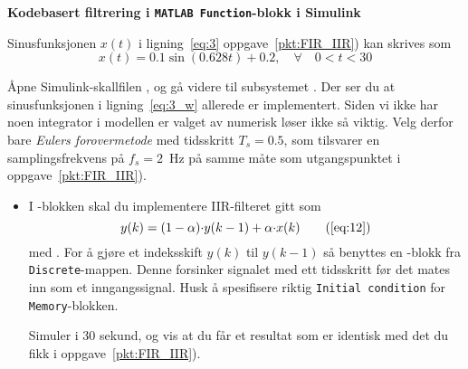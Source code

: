 \item
  {\bf Kodebasert filtrering i {\tt MATLAB Function}-blokk i Simulink}

  Sinusfunksjonen $x(t)$ i ligning~\eqref{eq:3}
  oppgave~\ref{pkt:FIR_IIR}) kan skrives som 
\begin{equation}
  x(t) = 0.1 \sin(0.628t)+0.2, \quad \forall \quad 0<t<30 \label{eq:3_w}
\end{equation}

Åpne Simulink-skallfilen , og gå videre
til subsystemet . 
Der ser du at sinusfunksjonen i ligning~\eqref{eq:3_w} allerede er implementert.
Siden vi ikke har noen integrator i
modellen er valget av numerisk løser ikke så viktig. Velg derfor bare
{\it Eulers forovermetode} med tidsskritt   $T_{s}{=}0.5$, som tilsvarer
en samplingsfrekvens   på $f_{s}{=}2$~Hz på samme måte som
utgangspunktet i  oppgave~\ref{pkt:FIR_IIR}).
 
\begin{itemize}
\item  I -blokken skal du implementere
  IIR-filteret gitt som
  \begin{equation}
    y(k) = (1-\alpha)  {\cdot}y(k-1) +  \alpha {\cdot}x(k) \tag{\ref{eq:12}}
  \end{equation}
  med . 
  For å gjøre et indeksskift $y(k)$ til $y(k-1)$ så benyttes
  en -blokk fra {\tt Discrete}-mappen. Denne
  forsinker signalet med ett tidsskritt før det mates inn som et
  inngangssignal.  Husk å spesifisere riktig
  {\tt Initial condition} for {\tt Memory}-blokken.

  Simuler i 30 sekund, og vis at du får et
  resultat som er identisk med det du fikk i oppgave~\ref{pkt:FIR_IIR}).

\end{itemize}
